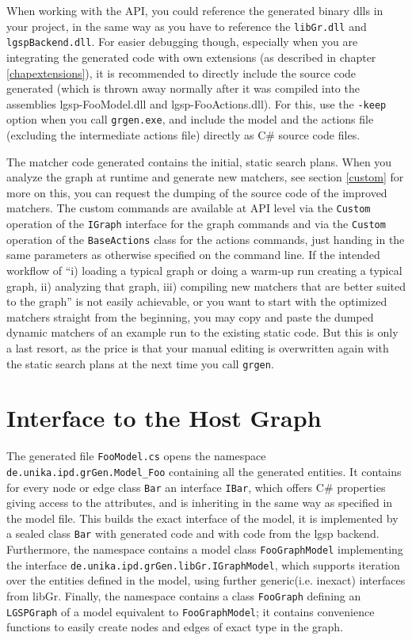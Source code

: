 When working with the API, you could reference the generated binary dlls in your project, in the same way as you have to reference the \texttt{libGr.dll} and \texttt{lgspBackend.dll}.
For easier debugging though, especially when you are integrating the generated code with own extensions (as described in chapter \ref{chapextensions}), it is recommended to directly include the source code generated (which is thrown away normally after it was compiled into the assemblies lgsp-FooModel.dll and lgsp-FooActions.dll).
For this, use the \texttt{-keep} option when you call \texttt{grgen.exe}, and include the model and the actions file (excluding the intermediate actions file) directly as C\# source code files.

The matcher code generated contains the initial, static search plans.
When you analyze the graph at runtime and generate new matchers, see section \ref{custom} for more on this, you can request the dumping of the source code of the improved matchers.
The custom commands are available at API level via the \texttt{Custom} operation of the \texttt{IGraph} interface for the graph commands and via the \texttt{Custom} operation of the \texttt{BaseActions} class for the actions commands, just handing in the same parameters as otherwise specified on the command line.
If the intended workflow of ``i) loading a typical graph or doing a warm-up run creating a typical graph, ii) analyzing that graph, iii) compiling new matchers that are better suited to the graph'' is not easily achievable, or you want to start with the optimized matchers straight from the beginning, you may copy and paste the dumped dynamic matchers of an example run to the existing static code. 
But this is only a last resort, as the price is that your manual editing is overwritten again with the static search plans at the next time you call \texttt{grgen}.


\section{Interface to the Host Graph}

The generated file \texttt{FooModel.cs} opens the namespace \texttt{de.unika.ipd.grGen.Model\_Foo} containing all the generated entities.
It contains for every node or edge class \texttt{Bar} an interface \texttt{IBar}, which offers C\# properties giving access to the attributes, and is inheriting in the same way as specified in the model file.
This builds the exact interface of the model, it is implemented by a sealed class \texttt{Bar} with generated code and with code from the lgsp backend.
Furthermore, the namespace contains a model class \texttt{FooGraphModel} implementing the interface \texttt{de.unika.ipd.grGen.libGr.IGraphModel},
which supports iteration over the entities defined in the model, using further generic(i.e. inexact) interfaces from libGr.
Finally, the namespace contains a class \texttt{FooGraph} defining an \texttt{LGSPGraph} of a model equivalent to \texttt{FooGraphModel}; 
it contains convenience functions to easily create nodes and edges of exact type in the graph.

